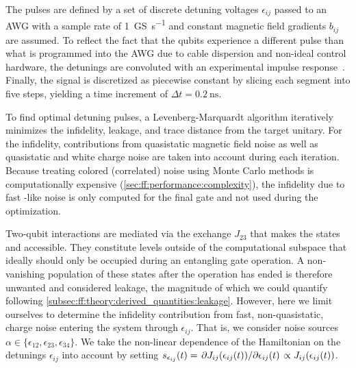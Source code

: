 The pulses are defined by a set of discrete detuning voltages $\epsilon_{ij}$ passed to an AWG with a sample rate of \qty{1}{\giga S\per\second} and constant magnetic field gradients $b_{ij}$ are assumed.
To reflect the fact that the qubits experience a different pulse than what is programmed into the AWG due to cable dispersion and non-ideal control hardware, the detunings are convoluted with an experimental impulse response~\cite{Cerfontaine2020b}.
Finally, the signal is discretized as piecewise constant by slicing each segment into five steps, yielding a time increment of $\Delta t = \qty{0.2}{\nano\second}$.

To find optimal detuning pulses, a Levenberg-Marquardt algorithm iteratively minimizes the infidelity, leakage, and trace distance from the target unitary.
For the infidelity, contributions from quasistatic magnetic field noise as well as quasistatic and white charge noise are taken into account during each iteration.
Because treating colored (correlated) noise using Monte Carlo methods is computationally expensive (\cf \cref{sec:ff:performance:complexity}), the infidelity due to fast \oneoverf-like noise is only computed for the final gate and not used during the optimization.

Two-qubit interactions are mediated via the exchange $J_{23}$ that makes the states \ketuudd and \ketdduu accessible.
They constitute levels outside of the computational subspace that ideally should only be occupied during an entangling gate operation.
A non-vanishing population of these states after the operation has ended is therefore unwanted and considered leakage, the magnitude of which we could quantify following \cref{subsec:ff:theory:derived_quantities:leakage}.
However, here we limit ourselves to determine the infidelity contribution from fast, \viz non-quasistatic, charge noise entering the system through $\epsilon_{ij}$.
That is, we consider noise sources $\alpha\in\lbrace\epsilon_{12},\epsilon_{23},\epsilon_{34}\rbrace$.
We take the non-linear dependence of the Hamiltonian on the detunings $\epsilon_{ij}$ into account by setting $s_{\epsilon_{ij}}(t) = \pdv*{J_{ij}(\epsilon_{ij}(t))}{\epsilon_{ij}(t)}\propto J_{ij}(\epsilon_{ij}(t))$.

